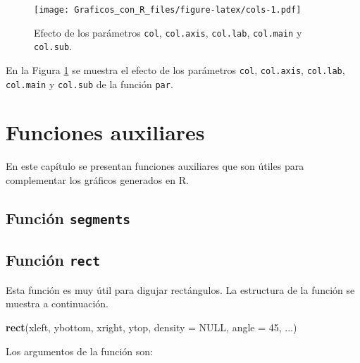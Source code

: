 \documentclass[10pt,]{krantz}
\makeatletter
\newenvironment{Shaded}{\begin{snugshade}}{\end{snugshade}}
\newcommand{\KeywordTok}[1]{\textcolor[rgb]{0.13,0.29,0.53}{\textbf{{#1}}}}
\newcommand{\DataTypeTok}[1]{\textcolor[rgb]{0.13,0.29,0.53}{{#1}}}
\newcommand{\DecValTok}[1]{\textcolor[rgb]{0.00,0.00,0.81}{{#1}}}
\newcommand{\OtherTok}[1]{\textcolor[rgb]{0.56,0.35,0.01}{{#1}}}
\newcommand{\NormalTok}[1]{{#1}}
\let\proglang=\textsf
\newenvironment{kframe}{%
\medskip{}
\setlength{\fboxsep}{.8em}
 \def\at@end@of@kframe{}%
 \ifinner\ifhmode%
  \def\at@end@of@kframe{\end{minipage}}%
  \begin{minipage}{\columnwidth}%
 \fi\fi%
 \def\FrameCommand##1{\hskip\@totalleftmargin \hskip-\fboxsep
 \colorbox{shadecolor}{##1}\hskip-\fboxsep
     \hskip-\linewidth \hskip-\@totalleftmargin \hskip\columnwidth}%
 \MakeFramed {\advance\hsize-\width
   \@totalleftmargin\z@ \linewidth\hsize
   \@setminipage}}%
 {\par\unskip\endMakeFramed%
 \at@end@of@kframe}
\renewenvironment{Shaded}{\begin{kframe}}{\end{kframe}}
\makeatother
\begin{document}
\begin{figure}[htbp]
\centering
\texttt{[image: Graficos\_con\_R\_files/figure-latex/cols-1.pdf]}
\caption{\label{fig:cols}Efecto de los parámetros \texttt{col},
\texttt{col.axis}, \texttt{col.lab}, \texttt{col.main} y
\texttt{col.sub}.}
\end{figure}

En la Figura \ref{fig:cols} se muestra el efecto de los parámetros
\texttt{col}, \texttt{col.axis}, \texttt{col.lab}, \texttt{col.main} y
\texttt{col.sub} de la función \texttt{par}.

\chapter{Funciones auxiliares}\label{funciones-auxiliares}

En este capítulo se presentan funciones auxiliares que son útiles para
complementar los gráficos generados en \proglang{R}.

\section{\texorpdfstring{Función \texttt{segments} 
}{Función segments  }}\label{funcion-segments}

\section{\texorpdfstring{Función \texttt{rect} 
}{Función rect  }}\label{funcion-rect}

Esta función es muy útil para digujar rectángulos. La estructura de la
función se muestra a continuación.

\begin{Shaded}
\begin{Highlighting}[]
\KeywordTok{rect}\NormalTok{(xleft, ybottom, xright, ytop,}
     \DataTypeTok{density =} \OtherTok{NULL}\NormalTok{, }\DataTypeTok{angle =} \DecValTok{45}\NormalTok{, ...)}
\end{Highlighting}
\end{Shaded}

Los argumentos de la función son:
\end{document}
